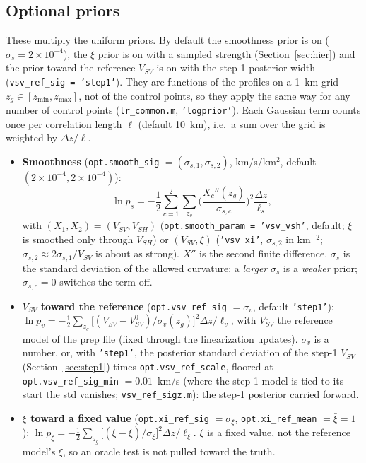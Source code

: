 \documentclass[11pt]{article}
\newcommand{\vsv}{V_{SV}}
\newcommand{\vsh}{V_{SH}}
\begin{document}
\subsection{Optional priors}\label{sec:optprior}
These multiply the uniform priors. By default the smoothness prior is on
($\sigma_s=2\times10^{-4}$), the $\xi$ prior is on with a sampled strength
(Section~\ref{sec:hier}) and the prior toward the reference $\vsv$ is on with
the step-1 posterior width (\texttt{vsv\_ref\_sig = 'step1'}). They are
functions of the profiles on a 1~km grid $z_g\in[z_{\min},z_{\max}]$, not
of the control points, so they apply the same way for any number of
control points (\texttt{lr\_common.m}, \texttt{'logprior'}). Each Gaussian
term counts once per correlation length $\ell$ (default 10~km), i.e.\ a sum
over the grid is weighted by $\Delta z/\ell$.
\begin{itemize}
\item \textbf{Smoothness} (\texttt{opt.smooth\_sig} $=(\sigma_{s,1},\sigma_{s,2})$,
  km/s/km$^2$, default $(2\times10^{-4},2\times10^{-4})$):
  \begin{equation}
   \ln p_s=-\frac12\sum_{c=1}^{2}\sum_{z_g}\Big(\frac{X_c''(z_g)}{\sigma_{s,c}}\Big)^2\frac{\Delta z}{\ell_s},
  \end{equation}
  with $(X_1,X_2)=(\vsv,\vsh)$ (\texttt{opt.smooth\_param = 'vsv\_vsh'},
  default; $\xi$ is smoothed only through $\vsh$) or $(\vsv,\xi)$
  (\texttt{'vsv\_xi'}, $\sigma_{s,2}$ in km$^{-2}$; $\sigma_{s,2}\approx2\sigma_{s,1}/\vsv$
  is about as strong). $X''$ is the second finite difference.
  $\sigma_s$ is the standard deviation of the allowed curvature:
  a \emph{larger} $\sigma_s$ is a \emph{weaker} prior; $\sigma_{s,c}=0$
  switches the term off.
\item \textbf{$\vsv$ toward the reference} (\texttt{opt.vsv\_ref\_sig} $=\sigma_v$,
  default \texttt{'step1'}):
  $\ln p_v=-\tfrac12\sum_{z_g}\big[(\vsv-\vsv^{0})/\sigma_v(z_g)\big]^2\Delta z/\ell_v$,
  with $\vsv^0$ the reference model of the prep file (fixed through the
  linearization updates). $\sigma_v$ is a number, or, with
  \texttt{'step1'}, the posterior standard deviation of the step-1 $\vsv$
  (Section~\ref{sec:step1}) times \texttt{opt.vsv\_ref\_scale}, floored at
  \texttt{opt.vsv\_ref\_sig\_min} $=0.01$~km/s (where the step-1 model is
  tied to its start the std vanishes; \texttt{vsv\_ref\_sigz.m}): the
  step-1 posterior carried forward.
\item \textbf{$\xi$ toward a fixed value} (\texttt{opt.xi\_ref\_sig} $=\sigma_\xi$,
  \texttt{opt.xi\_ref\_mean} $=\bar\xi=1$):
  $\ln p_\xi=-\tfrac12\sum_{z_g}\big[(\xi-\bar\xi)/\sigma_\xi\big]^2\Delta z/\ell_\xi$.
  $\bar\xi$ is a fixed value, not the reference model's $\xi$, so an oracle
  test is not pulled toward the truth.
\end{itemize}
\end{document}
